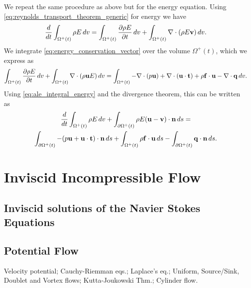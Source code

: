 \documentclass[oneside,a4paper,11pt]{report}
\begin{document}
We repeat the same procedure as above but for the energy equation. Using \cref{eq:reynolds_transport_theorem_generic} for energy we have
\begin{equation}
\label{eq:ale_integral_energy}
    \frac{d}{dt} \int_{\Omega^+(t)} \rho E \, dv = \int_{\Omega^+(t)} \frac{\partial \rho E}{\partial t} \, dv + \int_{\Omega^+(t)} \nabla \cdot (\rho E \mathbf{v}) \, dv.
\end{equation}
We integrate \cref{eq:energy_conservation_vector} over the volume $\Omega^+(t)$, which we express as
\begin{equation*}
    \int_{\Omega^+(t)} \frac{\partial \rho E}{\partial t} \, dv + \int_{\Omega^+(t)} \nabla \cdot (\rho \mathbf{u} E) \, dv = \int_{\Omega^+(t)} -\nabla \cdot (p\mathbf{u}) + \nabla \cdot (\mathbf{u} \cdot \mathbf{t}) + \rho \mathbf{f} \cdot \mathbf{u} - \nabla \cdot \mathbf{q} \, dv.
\end{equation*}
Using \cref{eq:ale_integral_energy} and the divergence theorem, this can be written as
\begin{multline}
    \label{eq:ale_integral_energy_conservation}
    \frac{d}{dt} \int_{\Omega^+(t)} \rho E \, dv + \int_{\partial \Omega^+(t)} \rho E (\mathbf{u} - \mathbf{v}) \cdot \mathbf{n} \, ds = \\
    \int_{\partial \Omega^+(t)} -(p\mathbf{u} + \mathbf{u} \cdot \mathbf{t}) \cdot \mathbf{n} \, ds + \int_{\Omega^+(t)} \rho \mathbf{f} \cdot \mathbf{u} \, ds - \int_{\partial \Omega^+(t)} \mathbf{q} \cdot \mathbf{n} \, ds.
\end{multline}

\part{Inviscid Incompressible Flow}

\chapter{Inviscid solutions of the Navier Stokes Equations}

\chapter{Potential Flow}
Velocity potential; Cauchy-Riemman eqs.; Laplace's eq.; Uniform, Source/Sink, Doublet and Vortex flows; Kutta-Joukowski Thm.; Cylinder flow.
\end{document}
